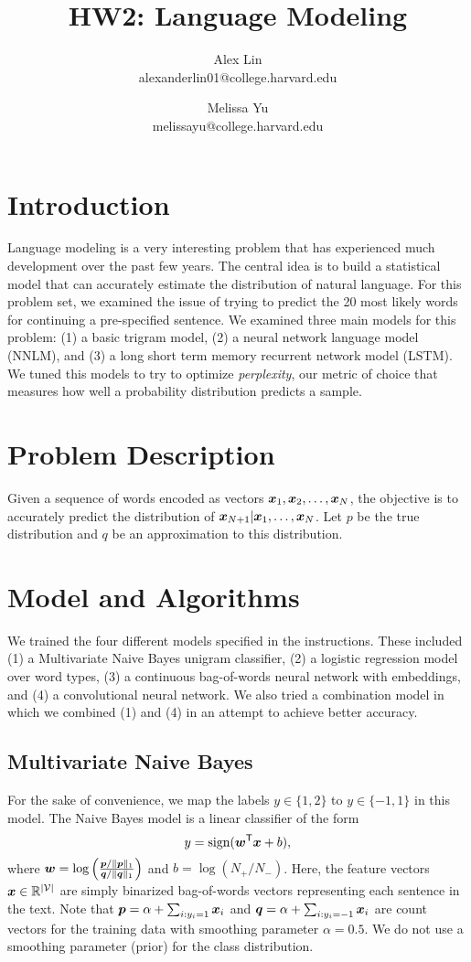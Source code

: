 \documentclass[11pt]{article}
\title{HW2: Language Modeling}
\author{Alex Lin \\ alexanderlin01@college.harvard.edu \and Melissa Yu \\ melissayu@college.harvard.edu }
\begin{document}
\maketitle{}
\section{Introduction}

Language modeling is a very interesting problem that has experienced much development over the past few years.  The central idea is to build a statistical model that can accurately estimate the distribution of natural language.  For this problem set, we examined the issue of trying to predict the 20 most likely words for continuing a pre-specified sentence.  We examined three main models for this problem: (1) a basic trigram model, (2) a neural network language model (NNLM), and (3) a long short term memory recurrent network model (LSTM).  We tuned this models to try to optimize \emph{perplexity}, our metric of choice that measures how well a probability distribution predicts a sample.

\section{Problem Description}

Given a sequence of words encoded as vectors $\boldsymbol{x}_1, \boldsymbol{x}_2, \ldots, \boldsymbol{x}_N$, the objective is to accurately predict the distribution of $\boldsymbol{x}_{N + 1} \vert \boldsymbol{x}_1, \ldots, \boldsymbol{x}_{N}$.  Let $p$ be the true distribution and $q$ be an approximation to this distribution.   

\section{Model and Algorithms}

We trained the four different models specified in the instructions.  These included (1) a Multivariate Naive Bayes unigram classifier, (2) a logistic regression model over word types, (3) a continuous bag-of-words neural network with embeddings, and (4) a convolutional neural network.  We also tried a combination model in which we combined (1) and (4) in an attempt to achieve better accuracy.  

\subsection{Multivariate Naive Bayes}
For the sake of convenience, we map the labels $y\in\{1, 2\}$ to $y\in\{-1, 1\}$ in this model. The Naive Bayes model is a linear classifier of the form
\[
y = \text{sign}(\boldsymbol{w}^{\mathsf{T}} \boldsymbol{x} + b),
\]
where $\boldsymbol{w} = \log\left(\frac{\boldsymbol{p} / \lVert\boldsymbol{p}\rVert_1}{\boldsymbol{q} / \lVert\boldsymbol{q}\rVert_1}\right)$ and $b = \log(N_+ / N_-)$. Here, the feature vectors $\boldsymbol{x}\in\mathbb{R}^{\lvert \mathcal{V}\rvert}$ are simply binarized bag-of-words vectors representing each sentence in the text. Note that $\boldsymbol{p} = \alpha + \sum_{i: y_i = 1} \boldsymbol{x}_i$ and $\boldsymbol{q} = \alpha + \sum_{i: y_i = -1} \boldsymbol{x}_i$ are count vectors for the training data with smoothing parameter $\alpha = 0.5$. We do not use a smoothing parameter (prior) for the class distribution.
\end{document}
